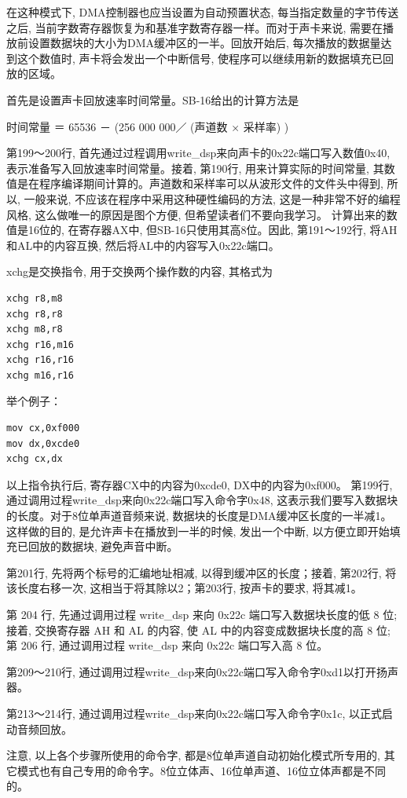 \documentclass[12pt]{article}
\begin{document}
\begin{CJK}{UTF8}{gbsn}
在这种模式下, DMA控制器也应当设置为自动预置状态, 每当指定数量的字节传送之后, 当前字数寄存器恢复为和基准字数寄存器一样。而对于声卡来说, 需要在播放前设置数据块的大小为DMA缓冲区的一半。回放开始后, 每次播放的数据量达到这个数值时,  声卡将会发出一个中断信号, 使程序可以继续用新的数据填充已回放的区域。

首先是设置声卡回放速率时间常量。SB-16给出的计算方法是

时间常量 ＝ 65536 －  (256 000 000／ (声道数 × 采样率) ) 

第199～200行, 首先通过过程调用write\_{}dsp来向声卡的0x22c端口写入数值0x40, 表示准备写入回放速率时间常量。接着,  第190行, 用来计算实际的时间常量, 其数值是在程序编译期间计算的。声道数和采样率可以从波形文件的文件头中得到, 所以, 一般来说, 不应该在程序中采用这种硬性编码的方法, 这是一种非常不好的编程风格, 这么做唯一的原因是图个方便, 但希望读者们不要向我学习。
计算出来的数值是16位的, 在寄存器AX中, 但SB-16只使用其高8位。因此, 第191～192行, 将AH和AL中的内容互换, 然后将AL中的内容写入0x22c端口。

xchg是交换指令, 用于交换两个操作数的内容, 其格式为
\begin{verbatim}
xchg r8,m8
xchg r8,r8
xchg m8,r8
xchg r16,m16
xchg r16,r16
xchg m16,r16
\end{verbatim}
举个例子：
\begin{verbatim}
mov cx,0xf000
mov dx,0xcde0
xchg cx,dx
\end{verbatim}
以上指令执行后, 寄存器CX中的内容为0xcde0, DX中的内容为0xf000。
第199行, 通过调用过程write\_{}dsp来向0x22c端口写入命令字0x48, 这表示我们要写入数据块的长度。对于8位单声道音频来说, 数据块的长度是DMA缓冲区长度的一半减1。这样做的目的, 是允许声卡在播放到一半的时候, 发出一个中断, 以方便立即开始填充已回放的数据块, 避免声音中断。

第201行, 先将两个标号的汇编地址相减, 以得到缓冲区的长度；接着, 第202行, 将该长度右移一次, 这相当于将其除以2；第203行, 按声卡的要求, 将其减1。

第 204 行, 先通过调用过程 write\_{}dsp 来向 0x22c 端口写入数据块长度的低 8 位;
接着, 交换寄存器 AH 和 AL 的内容, 使 AL 中的内容变成数据块长度的高 8 位;
第 206 行, 通过调用过程 write\_{}dsp 来向 0x22c 端口写入高 8 位。

第209～210行, 通过调用过程write\_{}dsp来向0x22c端口写入命令字0xd1以打开扬声器。

第213～214行, 通过调用过程write\_{}dsp来向0x22c端口写入命令字0x1c, 以正式启动音频回放。

注意, 以上各个步骤所使用的命令字, 都是8位单声道自动初始化模式所专用的, 其它模式也有自己专用的命令字。8位立体声、16位单声道、16位立体声都是不同的。


\end{CJK}
\end{document}
